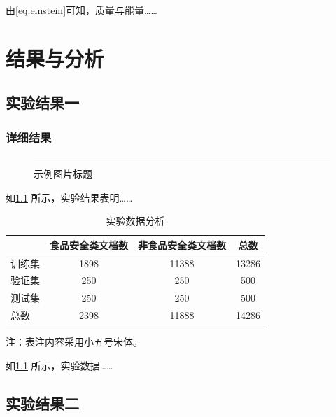 \documentclass[]{CAUthesis}
\begin{document}
由\cref{eq:einstein}可知，质量与能量……

\chapter{结果与分析}

\section{实验结果一}

\subsection{详细结果}

\begin{figure}[htbp]
  \centering
  \rule{0.8\textwidth}{5cm}  %
  \caption{示例图片标题}\label{fig:example}
\end{figure}

如\cref{fig:example} 所示，实验结果表明……

\begin{table}[htbp]
  \centering
  \caption{实验数据分析}\label{tab:example}
  \songti{}  %
  \begin{tabular}{lccc}
    \toprule
        & 食品安全类文档数 & 非食品安全类文档数 & 总数    \\
    \midrule
    训练集 & 1898     & 11388     & 13286 \\
    验证集 & 250      & 250       & 500   \\
    测试集 & 250      & 250       & 500   \\
    \midrule
    总数  & 2398     & 11888     & 14286 \\
    \bottomrule
  \end{tabular}

  \vspace{3pt}
  {\songti{} 注：表注内容采用小五号宋体。}  %
\end{table}

如\cref{tab:example} 所示，实验数据……

\section{实验结果二}
\end{document}
